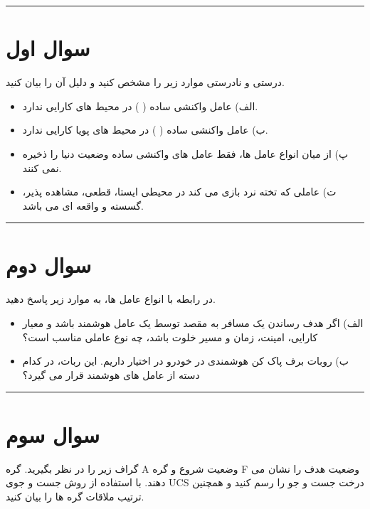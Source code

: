 \documentclass[a4paper,10pt]{article}
\begin{document}
\vspace{8pt}
\textcolor{AccentCyan}{\rule{\linewidth}{0.8pt}}
\section{\textcolor{AccentGold}{سوال اول}}
درستی و نادرستی موارد زیر را مشخص کنید و دلیل آن را بیان کنید.
\begin{itemize}
	\item 
	الف) عامل واکنشی ساده (
	)
	در محیط های 
	کارایی ندارد.
	\item 
	ب)
	عامل واکنشی ساده (
	)
	در محیط های پویا کارایی ندارد.
	\item 
	پ)
	از میان انواع عامل ها، فقط عامل های واکنشی ساده وضعیت دنیا را ذخیره نمی کنند.
	\item 
	ت) 
	عاملی که تخته نرد بازی می کند در محیطی ایستا، قطعی، مشاهده پذیر، گسسته و واقعه ای می باشد.
	
\end{itemize}
\bigskip
\textcolor{AccentCyan}{\rule{\linewidth}{0.4pt}}
\section{\textcolor{AccentGold}{سوال دوم}}
در رابطه با انواع عامل ها، به موارد زیر پاسخ دهید.
\begin{itemize}
	\item 
	الف) اگر هدف رساندن یک مسافر به مقصد توسط یک عامل هوشمند باشد و معیار کارایی، امینت، زمان و مسیر خلوت باشد، چه نوع عاملی مناسب است؟
	\item 
	ب) روبات برف پاک کن هوشمندی در خودرو در اختیار داریم. این ربات، در کدام دسته از عامل های هوشمند قرار می گیرد؟
\end{itemize}

\bigskip
\textcolor{AccentCyan}{\rule{\linewidth}{0.4pt}}
\section{\textcolor{AccentGold}{سوال سوم}}
گراف زیر را در نظر بگیرید. گره A وضعیت شروع و گره F وضعیت هدف را نشان می دهند. با استفاده از روش جست و جوی UCS درخت جست و جو را رسم کنید و همچنین ترتیب ملاقات گره ها را بیان کنید.
\end{document}
